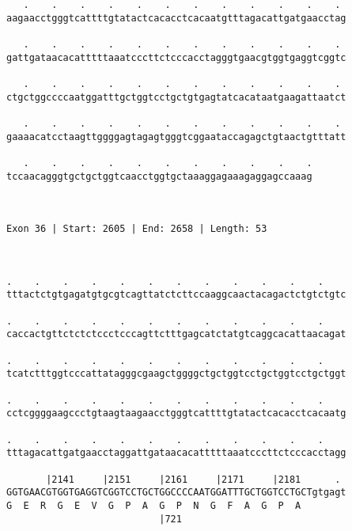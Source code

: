 \documentclass{article}
\begin{document}
\begin{Verbatim}
   .    .    .    .    .    .    .    .    .    .    .    . 
aagaacctgggtcattttgtatactcacacctcacaatgtttagacattgatgaacctag
                                                            
   .    .    .    .    .    .    .    .    .    .    .    . 
gattgataacacatttttaaatcccttctcccacctagggtgaacgtggtgaggtcggtc
                                                            
   .    .    .    .    .    .    .    .    .    .    .    . 
ctgctggccccaatggatttgctggtcctgctgtgagtatcacataatgaagattaatct
                                                            
   .    .    .    .    .    .    .    .    .    .    .    . 
gaaaacatcctaagttggggagtagagtgggtcggaataccagagctgtaactgtttatt
                                                            
   .    .    .    .    .    .    .    .    .    .    .
tccaacagggtgctgctggtcaacctggtgctaaaggagaaagaggagccaaag
                                                      
                                                      
 
Exon 36 | Start: 2605 | End: 2658 | Length: 53



.    .    .    .    .    .    .    .    .    .    .    .    
tttactctgtgagatgtgcgtcagttatctcttccaaggcaactacagactctgtctgtc
                                                            
.    .    .    .    .    .    .    .    .    .    .    .    
caccactgttctctctccctcccagttctttgagcatctatgtcaggcacattaacagat
                                                            
.    .    .    .    .    .    .    .    .    .    .    .    
tcatctttggtcccattatagggcgaagctggggctgctggtcctgctggtcctgctggt
                                                            
.    .    .    .    .    .    .    .    .    .    .    .    
cctcggggaagccctgtaagtaagaacctgggtcattttgtatactcacacctcacaatg
                                                            
.    .    .    .    .    .    .    .    .    .    .    .    
tttagacattgatgaacctaggattgataacacatttttaaatcccttctcccacctagg
                                                            
       |2141     |2151     |2161     |2171     |2181      . 
GGTGAACGTGGTGAGGTCGGTCCTGCTGGCCCCAATGGATTTGCTGGTCCTGCTgtgagt
G  E  R  G  E  V  G  P  A  G  P  N  G  F  A  G  P  A        
                           |721                             
  

\end{Verbatim}
\end{document}
